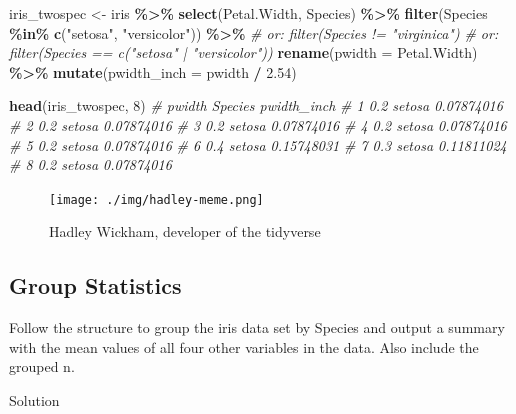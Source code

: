 \documentclass[
]{book}
\newenvironment{Shaded}{\begin{snugshade}}{\end{snugshade}}
\newcommand{\AttributeTok}[1]{\textcolor[rgb]{0.13,0.29,0.53}{#1}}
\newcommand{\CommentTok}[1]{\textcolor[rgb]{0.56,0.35,0.01}{\textit{#1}}}
\newcommand{\DecValTok}[1]{\textcolor[rgb]{0.00,0.00,0.81}{#1}}
\newcommand{\FloatTok}[1]{\textcolor[rgb]{0.00,0.00,0.81}{#1}}
\newcommand{\FunctionTok}[1]{\textcolor[rgb]{0.13,0.29,0.53}{\textbf{#1}}}
\newcommand{\NormalTok}[1]{#1}
\newcommand{\OtherTok}[1]{\textcolor[rgb]{0.56,0.35,0.01}{#1}}
\newcommand{\SpecialCharTok}[1]{\textcolor[rgb]{0.81,0.36,0.00}{\textbf{#1}}}
\newcommand{\StringTok}[1]{\textcolor[rgb]{0.31,0.60,0.02}{#1}}
\begin{document}
\begin{Shaded}
\begin{Highlighting}[]
\NormalTok{iris\_twospec }\OtherTok{\textless{}{-}}\NormalTok{ iris }\SpecialCharTok{\%\textgreater{}\%} 
  \FunctionTok{select}\NormalTok{(Petal.Width, Species) }\SpecialCharTok{\%\textgreater{}\%} 
  \FunctionTok{filter}\NormalTok{(Species }\SpecialCharTok{\%in\%} \FunctionTok{c}\NormalTok{(}\StringTok{"setosa"}\NormalTok{, }\StringTok{"versicolor"}\NormalTok{)) }\SpecialCharTok{\%\textgreater{}\%} 
  \CommentTok{\# or: filter(Species != "virginica")}
  \CommentTok{\# or: filter(Species == c("setosa" | "versicolor"))}
  \FunctionTok{rename}\NormalTok{(}\AttributeTok{pwidth =}\NormalTok{ Petal.Width) }\SpecialCharTok{\%\textgreater{}\%} 
  \FunctionTok{mutate}\NormalTok{(}\AttributeTok{pwidth\_inch =}\NormalTok{ pwidth }\SpecialCharTok{/} \FloatTok{2.54}\NormalTok{)}

\FunctionTok{head}\NormalTok{(iris\_twospec, }\DecValTok{8}\NormalTok{)}
\CommentTok{\#   pwidth Species pwidth\_inch}
\CommentTok{\# 1    0.2  setosa  0.07874016}
\CommentTok{\# 2    0.2  setosa  0.07874016}
\CommentTok{\# 3    0.2  setosa  0.07874016}
\CommentTok{\# 4    0.2  setosa  0.07874016}
\CommentTok{\# 5    0.2  setosa  0.07874016}
\CommentTok{\# 6    0.4  setosa  0.15748031}
\CommentTok{\# 7    0.3  setosa  0.11811024}
\CommentTok{\# 8    0.2  setosa  0.07874016}
\end{Highlighting}
\end{Shaded}

\begin{figure}
\centering
\texttt{[image: ./img/hadley-meme.png]}
\caption{Hadley Wickham, developer of the tidyverse}
\end{figure}

\subsection*{Group Statistics}\label{group-statistics}

Follow the structure to group the iris data set by Species and output a summary with the mean values of all four other variables in the data.
Also include the grouped n.

Solution
\end{document}
